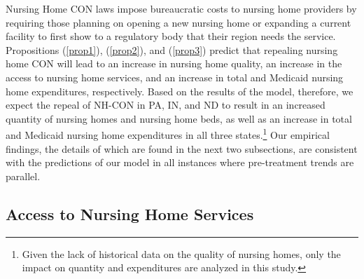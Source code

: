 \documentclass[../Main.tex]{subfiles}
\begin{document}
Nursing Home CON laws impose bureaucratic costs to nursing home providers by requiring those planning on opening a new nursing home or expanding a current facility to first show to a regulatory body that their region needs the service.  Propositions (\ref{prop1}), (\ref{prop2}), and (\ref{prop3}) predict that repealing nursing home CON will lead to an increase in nursing home quality, an increase in the access to nursing home services, and an increase in total and Medicaid nursing home expenditures, respectively. Based on the results of the model, therefore, we expect the repeal of NH-CON in PA, IN, and ND to result in an increased quantity of nursing homes and nursing home beds, as well as an increase in total and Medicaid nursing home expenditures in all three states.\footnote{Given the lack of historical data on the quality of nursing homes, only the impact on quantity and expenditures are analyzed in this study.}  Our empirical findings, the details of which are found in the next two subsections, are consistent with the predictions of our model in all instances where pre-treatment trends are parallel. \\

\subsection{Access to Nursing Home Services}
\end{document}
